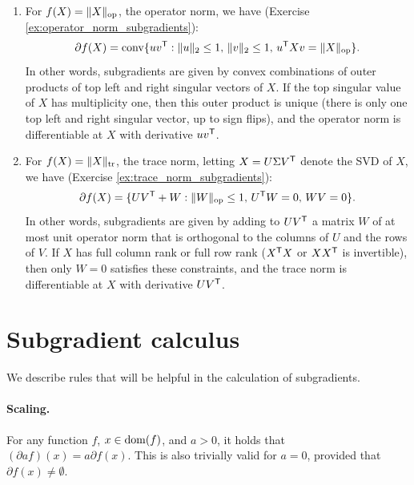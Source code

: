 \begin{Example}
\begin{enumerate}[label=\alph*., ref=\alph*]
\item {} 
  For $f(X) = \|X\|_{\mathrm{op}}$, the operator norm, we have (Exercise
  \ref{ex:operator_norm_subgradients}):  
  \[
  \partial f(X) = \operatorname{conv} \{ u v^{\mathsf{T}} : \|u\|_2 \leq 1, \, \|v\|_2 \leq 1, \, u^{\mathsf{T}} X
  v =  \|X\|_{\mathrm{op}} \}.  
  \]
  In other words, subgradients are given by convex combinations of outer 
  products of top left and right singular vectors of $X$. If the top singular
  value of $X$ has multiplicity one, then this outer product is unique (there is
  only one top left and right singular vector, up to sign flips), and the
  operator norm is differentiable at $X$ with derivative $u v^{\mathsf{T}}$.         

\item {}  
  For $f(X) = \|X\|_{\operatorname{tr}}$, the trace norm, letting $X = U \Sigma V^{\mathsf{T}}$ denote
  the SVD of $X$, we have (Exercise \ref{ex:trace_norm_subgradients}):   
  \[
  \partial f(X) = \{ U V^{\mathsf{T}} + W: \|W\|_{\mathrm{op}} \leq 1, \, U^{\mathsf{T}} W = 0, \, W V = 0
  \}. 
  \]
  In other words, subgradients are given by adding to $U V^{\mathsf{T}}$ a matrix $W$ of
  at most unit operator norm that is orthogonal to the columns of $U$ and the
  rows of $V$. If $X$ has full column rank or full row rank ($X^{\mathsf{T}} X$ or $X
  X^{\mathsf{T}}$ is invertible), then only $W=0$ satisfies these constraints, and the
  trace norm is differentiable at $X$ with derivative $U V^{\mathsf{T}}$.    
\end{enumerate}
\end{Example}

\section{Subgradient calculus}

We describe rules that will be helpful in the calculation of subgradients. 


\paragraph{Scaling.}

For any function $f$, $x \in \operatorname{dom}(f)$, and $a>0$, it holds that $(\partial a
f)(x) = a \partial f(x)$. This is also trivially valid for $a=0$, provided that
$\partial f(x) \not= \emptyset$.  

